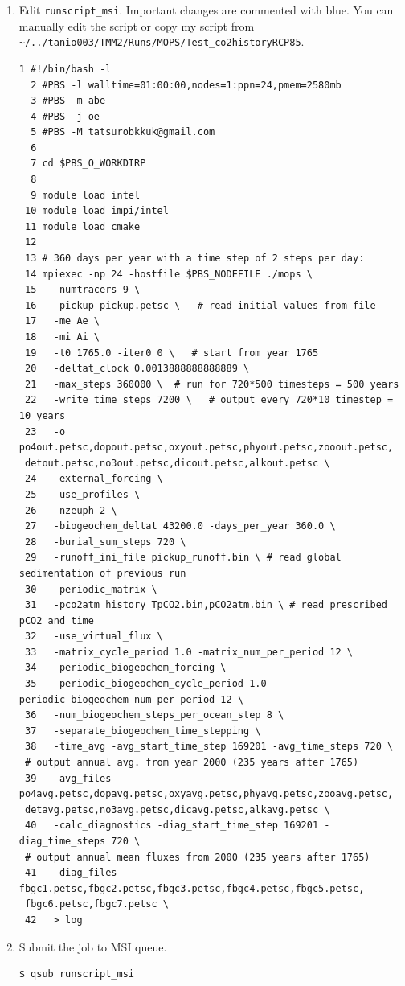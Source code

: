 \documentclass[a4paper]{article}
\begin{document}
\begin{enumerate}
\item Edit \verb|runscript_msi|. Important changes are commented with blue. You can manually edit the script or copy my script from \verb|~/../tanio003/TMM2/Runs/MOPS/Test_co2historyRCP85|.
\lstset{language=sh} 
\begin{lstlisting}[frame=single,basicstyle=\scriptsize,commentstyle=\color{blue}]
  1 #!/bin/bash -l
  2 #PBS -l walltime=01:00:00,nodes=1:ppn=24,pmem=2580mb
  3 #PBS -m abe
  4 #PBS -j oe
  5 #PBS -M tatsurobkkuk@gmail.com
  6
  7 cd $PBS_O_WORKDIRP
  8
  9 module load intel
 10 module load impi/intel
 11 module load cmake
 12
 13 # 360 days per year with a time step of 2 steps per day:
 14 mpiexec -np 24 -hostfile $PBS_NODEFILE ./mops \
 15   -numtracers 9 \
 16   -pickup pickup.petsc \   # read initial values from file
 17   -me Ae \
 18   -mi Ai \
 19   -t0 1765.0 -iter0 0 \   # start from year 1765
 20   -deltat_clock 0.0013888888888889 \   
 21   -max_steps 360000 \  # run for 720*500 timesteps = 500 years
 22   -write_time_steps 7200 \   # output every 720*10 timestep = 10 years
 23   -o po4out.petsc,dopout.petsc,oxyout.petsc,phyout.petsc,zooout.petsc,
 detout.petsc,no3out.petsc,dicout.petsc,alkout.petsc \
 24   -external_forcing \
 25   -use_profiles \
 26   -nzeuph 2 \
 27   -biogeochem_deltat 43200.0 -days_per_year 360.0 \
 28   -burial_sum_steps 720 \
 29   -runoff_ini_file pickup_runoff.bin \ # read global sedimentation of previous run
 30   -periodic_matrix \
 31   -pco2atm_history TpCO2.bin,pCO2atm.bin \ # read prescribed pCO2 and time
 32   -use_virtual_flux \
 33   -matrix_cycle_period 1.0 -matrix_num_per_period 12 \
 34   -periodic_biogeochem_forcing \
 35   -periodic_biogeochem_cycle_period 1.0 -periodic_biogeochem_num_per_period 12 \
 36   -num_biogeochem_steps_per_ocean_step 8 \
 37   -separate_biogeochem_time_stepping \
 38   -time_avg -avg_start_time_step 169201 -avg_time_steps 720 \ 
 # output annual avg. from year 2000 (235 years after 1765)
 39   -avg_files po4avg.petsc,dopavg.petsc,oxyavg.petsc,phyavg.petsc,zooavg.petsc,
 detavg.petsc,no3avg.petsc,dicavg.petsc,alkavg.petsc \
 40   -calc_diagnostics -diag_start_time_step 169201 -diag_time_steps 720 \ 
 # output annual mean fluxes from 2000 (235 years after 1765)
 41   -diag_files fbgc1.petsc,fbgc2.petsc,fbgc3.petsc,fbgc4.petsc,fbgc5.petsc,
 fbgc6.petsc,fbgc7.petsc \
 42   > log
\end{lstlisting}

\item Submit the job to MSI queue.
\begin{lstlisting}[style=DOS]
 $ qsub runscript_msi
\end{lstlisting}


\end{enumerate}
\end{document}
